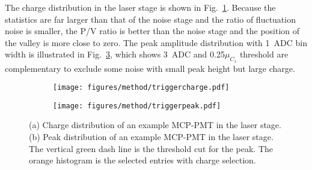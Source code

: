 The charge distribution in the laser stage is shown in Fig.~\ref{fig:triggercharge}. Because the statistics are far larger than that of the noise stage and the ratio of fluctuation noise is smaller, the P/V ratio is better than the noise stage and the position of the valley is more close to zero. The peak amplitude distribution with \SI{1}{ADC} bin width is illustrated in Fig.~\ref{fig:triggerpeak}, which shows \SI{3}{ADC} and 0.25$\mu_{C_1}$ threshold are complementary to exclude some noise with small peak height but large charge.

\begin{figure}[!htbp]
    \centering
    \begin{subfigure}[b]{0.4\textwidth}
        \texttt{[image: figures/method/triggercharge.pdf]}
        \caption{}%
        \label{fig:triggercharge}
    \end{subfigure}
    \begin{subfigure}[b]{0.4\textwidth}
        \texttt{[image: figures/method/triggerpeak.pdf]}
        \caption{}%
        \label{fig:triggerpeak}
    \end{subfigure}
    \caption{(a) Charge distribution of an example MCP-PMT in the laser stage. (b) Peak distribution of an example MCP-PMT in the laser stage. The vertical green dash line is the threshold cut for the peak. The orange histogram is the selected entries with charge selection.}
\end{figure}

